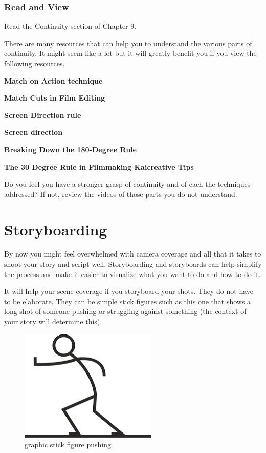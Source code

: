 \documentclass[
]{book}
\begin{document}
\begin{reflect}
\hypertarget{read-and-view-1}{%
\subsubsection*{Read and View}\label{read-and-view-1}}

Read the Continuity section of Chapter 9.

There are many resources that can help you to understand the various parts of continuity. It might seem like a lot but it will greatly benefit you if you view the following resources.

\textbf{Match on Action technique}

\textbf{Match Cuts in Film Editing}

\textbf{Screen Direction rule}

\textbf{Screen direction}

\textbf{Breaking Down the 180-Degree Rule}

\textbf{The 30 Degree Rule in Filmmaking \textbar{} Kaicreative \textbar{} Tips}

Do you feel you have a stronger grasp of continuity and of each the techniques addressed? If not, review the videos of those parts you do not understand.
\end{reflect}

\hypertarget{storyboarding}{%
\section*{Storyboarding}\label{storyboarding}}

By now you might feel overwhelmed with camera coverage and all that it takes to shoot your story and script well. Storyboarding and storyboards can help simplify the process and make it easier to visualize what you want to do and how to do it.

It will help your scene coverage if you storyboard your shots. They do not have to be elaborate. They can be simple stick figures such as this one that shows a long shot of someone pushing or struggling against something (the context of your story will determine this).

\begin{figure}
\centering
\includegraphics{assets/unit5/Picture1.png}
\caption{graphic stick figure pushing}
\end{figure}
\end{document}

